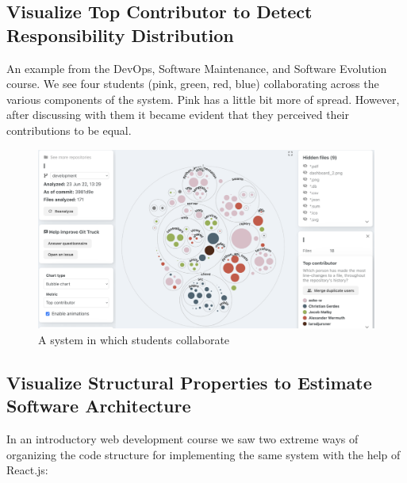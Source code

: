 \documentclass[conference]{IEEEtran}
\begin{document}
\newpage
\subsection{Visualize Top Contributor to Detect Responsibility Distribution}

An example from the DevOps, Software Maintenance, and Software Evolution course. We see four students (pink, green, red, blue) collaborating across the various components of the system. Pink has a little bit more of spread. However, after discussing with them it became evident that they perceived their contributions to be equal. 

    \begin{figure}[h!]
    \centering
    \includegraphics[width=\linewidth]{img/aske_team.png}
    \caption{A system in which students collaborate}
    \label{fig:tid_11}
    \end{figure}




\newpage
\subsection{Visualize Structural Properties to Estimate Software Architecture}

In an introductory web development course we saw two extreme ways of organizing the code structure for implementing the same system with the help of React.js:
\end{document}
